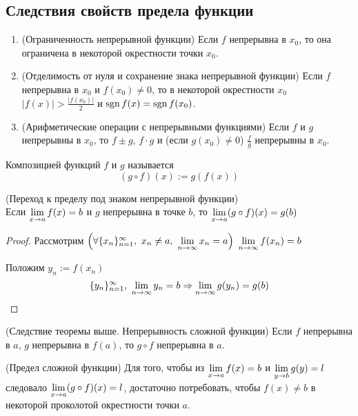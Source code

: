 \subsection{Следствия свойств предела функции}

\begin{enumerate}
	\item (Ограниченность непрерывной функции) Если $f$ непрерывна в $x_0$, то она ограничена в некоторой окрестности точки $x_0$.
	
	\item (Отделимость от нуля и сохранение знака непрерывной функции) Если $f$ непрерывна в $x_0$ и $f(x_0) \neq 0$, то в некоторой окрестности $x_0$ $|f(x)| > \frac{|f(x_0)|}{2}$ и $\operatorname{sgn} f(x) = \operatorname{sgn} f(x_0)$.
	
	\item (Арифметические операции с непрерывными функциями) Если $f$ и $g$ непрерывны в $x_0$, то $f \pm g$, $f \cdot g$ и (если $g(x_0) \neq 0$) $\frac{f}{g}$ непрерывны в $x_0$.
\end{enumerate}

\begin{definition}
	Композицией функций $f$ и $g$ называется 
	$$
		(g \circ f)(x) := g(f(x))
	$$
\end{definition}

\begin{theorem} (Переход к пределу под знаком непрерывной функции) \\
	Если $\lim\limits_{x \to a} f(x) = b$ и $g$ непрерывна в точке $b$, то $\lim\limits_{x \to a} (g \circ f)(x) = g(b)$
\end{theorem}

\begin{proof}
	Рассмотрим $\left(\forall \{x_n\}_{n = 1}^\infty,\ x_n \neq a,\ \lim\limits_{n \to \infty} x_n = a\right)\ \lim\limits_{n \to \infty} f(x_n) = b$
	
	Положим $y_n := f(x_n)$
	$$
		\{y_n\}_{n = 1}^\infty,\ \lim\limits_{n \to \infty} y_n = b \Rightarrow \lim\limits_{n \to \infty} g(y_n) = g(b) 
	$$
\end{proof}

\begin{addition} (Следствие теоремы выше. Непрерывность сложной функции)
	Если $f$ непрерывна в $a$, $g$ непрерывна в $f(a)$, то $g \circ f$ непрерывна в $a$.
\end{addition}

\begin{note} (Предел сложной функции)
	Для того, чтобы из $\lim\limits_{x \to a} f(x) = b$ и $\lim\limits_{y \to b} g(y) = l$ следовало $\lim\limits_{x \to a} (g \circ f)(x) = l$, достаточно потребовать, чтобы $f(x) \neq b$ в некоторой проколотой окрестности точки $a$.
\end{note}

